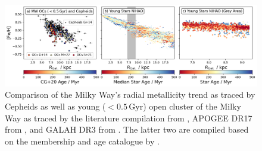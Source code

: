 \documentclass[fleqn,usenatbib]{mnras}
\newcommand{\SB}[1]{{\textcolor{purple}{SB: #1}}}
\newcommand{\TB}[1]{{\textcolor{orange}{TB: #1}}}
\newcommand{\nihaoAGEmax}{$0.5\,\mathrm{Gyr}$}
\begin{document}
\begin{figure}
    \centering
    \includegraphics[width=\textwidth]{figures/radial_metallicity_gradients_mw_vs_nihao.png}
    \caption{Comparison of the Milky Way's radial metallicity trend as traced by Cepheids \citep[black triangles, compiled from literature by][G+14]{Genovali2014} as well as young ($<$\nihaoAGEmax) open cluster of the Milky Way as traced by the literature compilation from \citet[][G+14 as squares]{Genovali2014}, APOGEE DR17 from \citet[][M+22 as crosses]{Myers2022}, and GALAH DR3 from \citet[][S+21 as circles]{Spina2021}. The latter two are compiled based on the membership and age catalogue by \citet[][CG+20]{CantatGaudin2020}.
    }
    \label{fig:radial_metallicity_gradients_mw_vs_nihao}
\end{figure}





\end{document}
